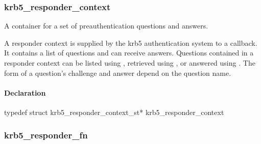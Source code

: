 \documentclass[letterpaper,10pt,english]{sphinxmanual}
\begin{document}
\subsubsection{krb5\_responder\_context}
\label{appdev/refs/types/krb5_responder_context:krb5-responder-context-struct}\label{appdev/refs/types/krb5_responder_context::doc}\label{appdev/refs/types/krb5_responder_context:krb5-responder-context}

\begin{fulllineitems}
\label{appdev/refs/types/krb5_responder_context:c.krb5_responder_context}
\end{fulllineitems}


A container for a set of preauthentication questions and answers.

A responder context is supplied by the krb5 authentication system to a {\hyperref[appdev/refs/types/krb5_responder_fn:c.krb5_responder_fn]{}} callback. It contains a list of questions and can receive answers. Questions contained in a responder context can be listed using {\hyperref[appdev/refs/api/krb5_responder_list_questions:c.krb5_responder_list_questions]{}} , retrieved using {\hyperref[appdev/refs/api/krb5_responder_get_challenge:c.krb5_responder_get_challenge]{}} , or answered using {\hyperref[appdev/refs/api/krb5_responder_set_answer:c.krb5_responder_set_answer]{}} . The form of a question's challenge and answer depend on the question name.


\paragraph{Declaration}
\label{appdev/refs/types/krb5_responder_context:declaration}
typedef struct krb5\_responder\_context\_st* krb5\_responder\_context


\subsubsection{krb5\_responder\_fn}
\label{appdev/refs/types/krb5_responder_fn:krb5-responder-fn-struct}\label{appdev/refs/types/krb5_responder_fn::doc}\label{appdev/refs/types/krb5_responder_fn:krb5-responder-fn}

\begin{fulllineitems}
\label{appdev/refs/types/krb5_responder_fn:c.krb5_responder_fn}
\end{fulllineitems}
\end{document}

